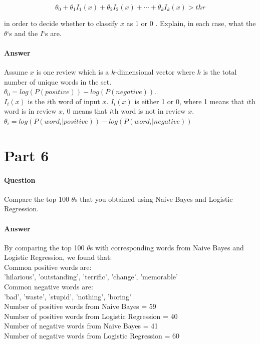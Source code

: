 \documentclass[11pt,twoside]{article}
\begin{document}
\[\theta_0+\theta_1I_1(x)+\theta_2I_2(x)+\cdots+\theta_kI_k(x) > thr\]

in order to decide whether to classify $x$ as 1 or 0 . Explain, in each case, what the $\theta$‘s and the $I$‘s are.

\paragraph{Answer}
Assume $x$ is one review which is a $k$-dimensional vector where $k$ is the total number of unique words in the set.\\
$\theta_0 = log(P(positive)) - log(P(negative))$.\\
$I_i(x)$ is the $i$th word of input $x$. $I_i(x)$ is either 1 or 0, where 1 means that $i$th word is in review $x$, 0 means that $i$th word is not in review $x$.\\
$\theta_i = log(P(word_i | positive))  - log(P(word_i | negative))$
\clearpage

\section*{Part 6}
\paragraph{Question}
Compare the top 100 $\theta$s that you obtained using Naive Bayes and Logistic Regression.
\paragraph{Answer}
By comparing the top 100 $\theta$s with corresponding words from Naive Bayes and Logistic Regression, we found that:\\

Common positive words are:\\
{'hilarious', 'outstanding', 'terrific', 'change', 'memorable'}\\

Common negative words are:\\
{'bad', 'waste', 'stupid', 'nothing', 'boring'}\\

Number of positive words from Naive Bayes = 59\\
Number of positive words from Logistic Regression = 40\\
Number of negative words from Naive Bayes = 41\\
Number of negative words from Logistic Regression = 60\\
\end{document}
